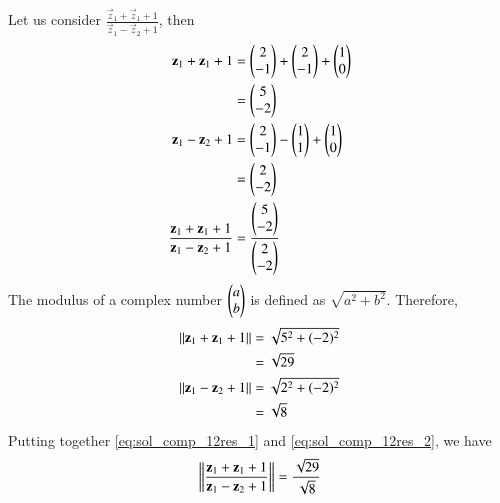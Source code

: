 	Let us consider $\frac{\vec{z}_1 + \vec{z}_1 + 1}{\vec{z}_1-\vec{z}_2+1}$, then
	\begin{align}
		\mathbf{z}_1 + \mathbf{z}_1 + 1 &= \begin{pmatrix}2 \\ -1\end{pmatrix} + \begin{pmatrix} 2 \\ -1\end{pmatrix} + \begin{pmatrix} 1 \\ 0\end{pmatrix} \\
		&= \begin{pmatrix}5 \\ -2\end{pmatrix}\\
		\mathbf{z}_1 - \mathbf{z}_2 + 1 &= \begin{pmatrix}2 \\ -1\end{pmatrix} - \begin{pmatrix} 1 \\ 1\end{pmatrix} + \begin{pmatrix} 1 \\ 0\end{pmatrix} \\
		&= \begin{pmatrix}2 \\ -2\end{pmatrix} \\ 
		\frac{\mathbf{z}_1 + \mathbf{z}_1 + 1}{\mathbf{z}_1-\mathbf{z}_2+1} &= \frac{\begin{pmatrix}5 \\ -2\end{pmatrix}}{\begin{pmatrix}2 \\ -2\end{pmatrix}}\label{eq:sol_comp_12result} 
	\end{align}
	The modulus of a complex number $\begin{pmatrix}a \\ b\end{pmatrix}$ is defined as $\sqrt{a^{2} + b^{2}}$.
	Therefore, 
	\begin{align}
		\left\lVert\mathbf{z}_1 + \mathbf{z}_1 + 1\right\rVert &= \sqrt{5^{2} + (-2)^{2}} \\ 
		&= \sqrt{29}  \label{eq:sol_comp_12res_1} \\
		\left\lVert\mathbf{z}_1 -  \mathbf{z}_2 + 1\right\rVert &= \sqrt{2^{2} + (-2)^{2}} \\ 
		&= \sqrt{8} \label{eq:sol_comp_12res_2}
	\end{align}
Putting together \eqref{eq:sol_comp_12res_1} and \eqref{eq:sol_comp_12res_2}, we have
\begin{align}
		\left\lVert\frac{\mathbf{z}_1 + \mathbf{z}_1 + 1}{\mathbf{z}_1-\mathbf{z}_2+1}\right\rVert	 = \frac{\sqrt{29}}{\sqrt{8}}
\end{align}
